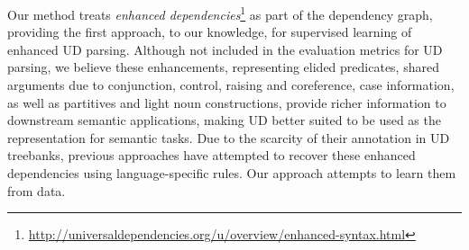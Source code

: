 \documentclass[11pt,a4paper]{article}
\begin{document}
Our method treats \textit{enhanced dependencies}\footnote{\url{http://universaldependencies.org/u/overview/enhanced-syntax.html}}
as part of the dependency graph, providing the first approach, to our knowledge,
for supervised learning of enhanced UD parsing.
Although not included in the evaluation metrics for UD parsing,
we believe these enhancements, representing elided predicates,
shared arguments due to conjunction, control, raising and coreference,
case information,
as well as partitives and light noun constructions,
provide richer information to downstream semantic applications,
making UD better suited to be used as the representation for semantic tasks.
Due to the scarcity of their annotation in UD treebanks, previous approaches
\cite{SCHUSTER16.779,D17-1009} have attempted to recover these enhanced
dependencies using language-specific rules.
Our approach attempts to learn them from data.
\end{document}
